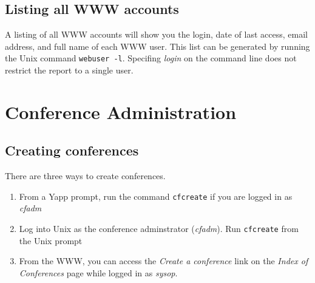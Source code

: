 \documentclass[twoside]{report}
\begin{document}

   \section{Listing all WWW accounts}
      A listing of all WWW accounts will show you the login, date of last
      access, email address, and full name of each WWW user.  This list can
      be generated by running the Unix command {\tt webuser -l}.
      Specifing {\em login} on the command line does not restrict the 
      report to a single user.
 
\chapter{Conference Administration} \label{c:conf}
   \section{Creating conferences} \label{s:create}
      There are three ways to create conferences.  
   
\renewcommand {\theenumi}{\Alph{enumi}}
\renewcommand {\labelenumi}{\theenumi.}

      \begin{enumerate}
         \item From a Yapp prompt, run the command {\tt cfcreate}
            if you are logged in as {\em cfadm}
   
         \item Log into Unix as the conference adminstrator ({\em cfadm}).  Run
            {\tt cfcreate} from the Unix prompt
   
         \item  From the WWW, you can access the {\em Create a conference} 
            link on the {\em Index of Conferences} page while logged in as 
            {\em sysop}.
      \end{enumerate}

\renewcommand {\theenumi}{\arabic{enumi}}
\renewcommand {\labelenumi}{\theenumi.}
\end{document}
